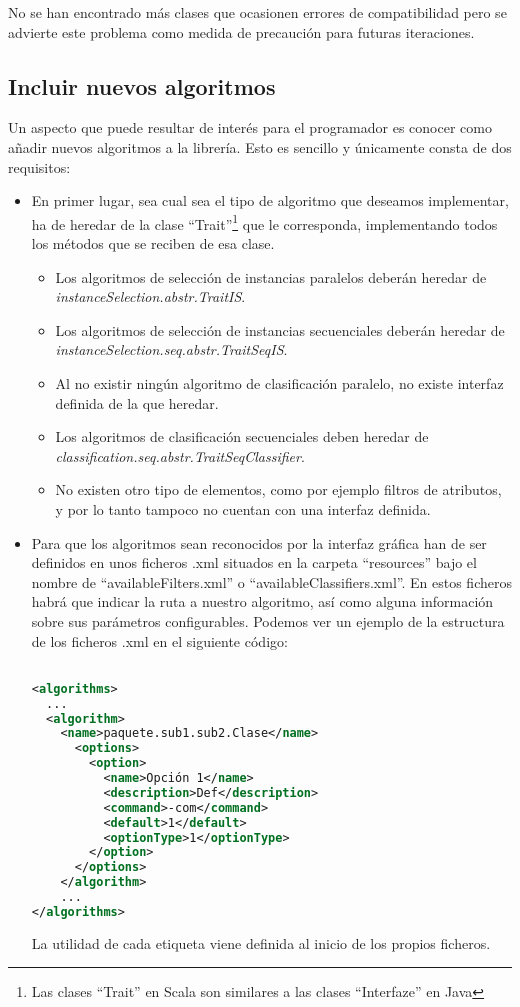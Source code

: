 No se han encontrado más clases que ocasionen errores de compatibilidad pero se advierte este problema como medida de precaución para futuras iteraciones.

\subsection{Incluir nuevos algoritmos}

Un aspecto que puede resultar de interés para el programador es conocer como añadir nuevos algoritmos a la librería. Esto es sencillo y únicamente consta de dos requisitos:

\begin{itemize}
\item En primer lugar, sea cual sea el tipo de algoritmo que deseamos implementar, ha de heredar de la clase ``Trait''\footnote{Las clases ``Trait'' en Scala son similares a las clases ``Interfaze'' en Java} que le corresponda, implementando todos los métodos que se reciben de esa clase.
	\begin{itemize}
		\item Los algoritmos de selección de instancias paralelos deberán heredar de \textit{instanceSelection.abstr.TraitIS}.
		\item Los algoritmos de selección de instancias secuenciales deberán heredar de \textit{instanceSelection.seq.abstr.TraitSeqIS}.
		\item Al no existir ningún algoritmo de clasificación paralelo, no existe interfaz definida de la que heredar.
		\item Los algoritmos de clasificación secuenciales deben heredar de \textit{classification.seq.abstr.TraitSeqClassifier}.
		\item No existen otro tipo de elementos, como por ejemplo filtros de atributos, y por lo tanto tampoco no cuentan con una interfaz definida.
	\end{itemize} 
\item Para que los algoritmos sean reconocidos por la interfaz gráfica han de ser definidos en unos ficheros .xml situados en la carpeta ``resources'' bajo el nombre de ``availableFilters.xml'' o ``availableClassifiers.xml''. En estos ficheros habrá que indicar la ruta a nuestro algoritmo, así como alguna información sobre sus parámetros configurables. Podemos ver un ejemplo de la estructura de los ficheros .xml en el siguiente código:

\begin{lstlisting}[language=xml,keywordstyle=\color{black}]

<algorithms>
  ...
  <algorithm>
    <name>paquete.sub1.sub2.Clase</name>
	  <options>
		<option>
		  <name>Opción 1</name>
		  <description>Def</description>
		  <command>-com</command>
		  <default>1</default>
		  <optionType>1</optionType>
		</option>
	  </options>
	</algorithm>
	...
</algorithms>

\end{lstlisting}

La utilidad de cada etiqueta viene definida al inicio de los propios ficheros.

\end{itemize}


